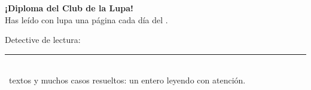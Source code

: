 \begin{center}
\vspace*{2.6cm}

\iconoLupa[0.9]

\vspace{9mm}
{\fontsize{32}{38}\selectfont\bfseries\color{colorLectura} ¡Diploma del Club de la Lupa!}\\[8mm]
{\Large Has leído con lupa una página cada día del .}\\[10mm]
{\Large Detective de lectura: \rule{65mm}{0.4pt}}\\[14mm]
{\large \totaldias\ textos y muchos casos resueltos: un  entero leyendo con atención.}
\end{center}
\vspace*{\fill}
\newpage
